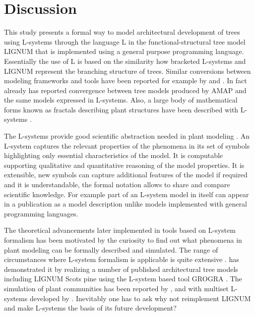\section{Discussion}

This study presents a formal way to model architectural development of
trees   using    L-systems   through    the   language   L    in   the
functional-structural tree  model LIGNUM  that is implemented  using a
general  purpose programming language.   Essentially the  use of  L is
based on  the similarity how bracketed L-systems  and LIGNUM represent
the  branching  structure   of  trees.   Similar  conversions  between
modeling  frameworks  and tools  have  been  reported  for example  by
\citet{ferraro:02}   and   \citet{dzierzon:03}.    In   fact   already
\citet{kurth:em94}  has  reported   convergence  between  tree  models
produced by AMAP and the  same models expressed in L-systems.  Also, a
large body  of mathematical forms  known as fractals  describing plant
structures have been described with L-systems \citep{kurth:99}.

The  L-systems provide  good  scientific abstraction  needed in  plant
modeling \citep[c.f.][]{regev:02}.  An  L-system captures the relevant
properties of  the phenomena in  its set of symbols  highlighting only
essential characteristics  of the model.  It  is computable supporting
qualitative and quantitative reasoning of the model properties.  It is
extensible, new  symbols can capture additional features  of the model
if required  and it is  understandable, the formal notation  allows to
share  and  compare scientific  knowledge.   For  example  part of  an
L-system  model in  itself  can appear  in  a publication  as a  model
description  unlike   models  implemented  with   general  programming
languages.

The  theoretical  advancements later  implemented  in  tools based  on
L-system formalism  has been motivated  by the curiosity to  find out
what  phenomena  in  plant  modeling  can be  formally  described  and
simulated.   The range  of circumstances  where L-system  formalism is
applicable  is quite  extensive  \citep{pp:99}.  \citet{kurth:99}  has
demonstrated it by realizing  a number of published architectural tree
models  including  LIGNUM Scots  pine  \citep{perttunen:96} using  the
L-system based tool GROGRA  \citep{kurth:94}. The simulation of plant
communities has been  reported by \citet{deussen:98}, \citet{kurth:99}
and with multiset  L-systems developed by \citet{lane:02}.  Inevitably
one has to ask why not reimplement LIGNUM and make L-systems the basis
of its future development?

